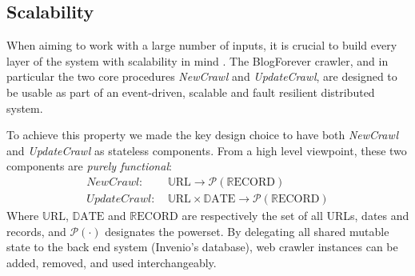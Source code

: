 \subsection{Scalability}
When aiming to work with a large number of inputs, it is crucial to build every layer of the system with scalability in mind \cite{thereactivemanifesto2013}. The BlogForever crawler, and in particular the two core procedures \emph{NewCrawl} and \emph{UpdateCrawl}, are designed to be usable as part of an event-driven, scalable and fault resilient distributed system.

To achieve this property we made the key design choice to have both \emph{NewCrawl} and \emph{UpdateCrawl} as stateless components. From a high level viewpoint, these two components are \emph{purely functional}:
%
\newcommand\URL{\mathbb{U}\text{RL}}
\newcommand\DATE{\mathbb{D}\text{ATE}}
\newcommand\RECORD{\mathbb{R}\text{ECORD}}
\begin{equation*}
  \begin{split}
    NewCrawl:    &~ \URL \rightarrow \mathcal{P}(\RECORD)\\
    UpdateCrawl: &~ \URL \times \DATE \rightarrow \mathcal{P}(\RECORD)
  \end{split}
\end{equation*}
Where $\URL$, $\DATE$ and $\RECORD$ are respectively the set of all URLs, dates and records, and $\mathcal{P}(\cdot)$ designates the powerset. By delegating all shared mutable state to the back end system (Invenio's database), web crawler instances can be added, removed, and used interchangeably.
